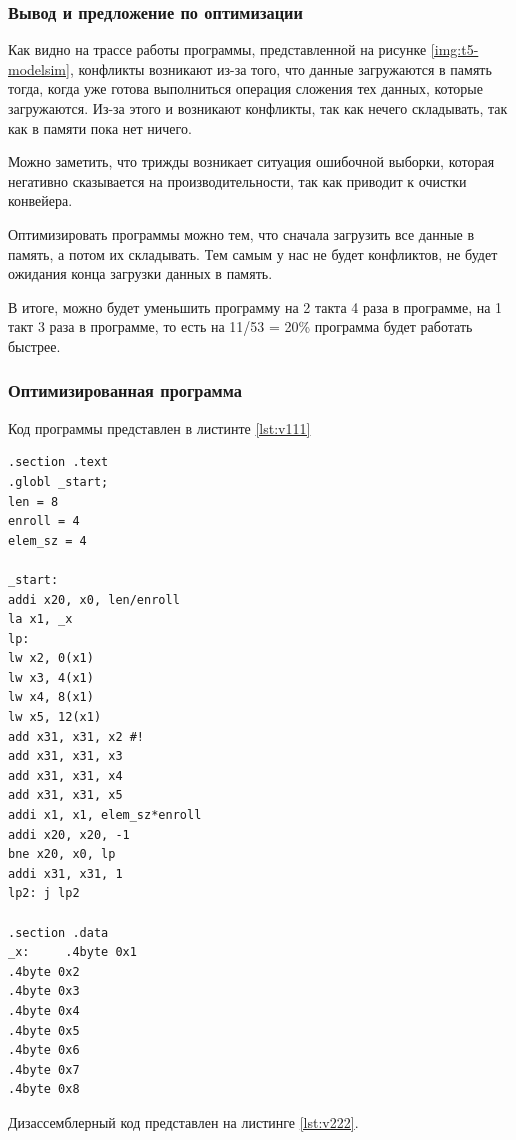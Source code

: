 \clearpage

\subsubsection*{Вывод и предложение по оптимизации}
Как видно на трассе работы программы, представленной на рисунке \ref{img:t5-modelsim}, конфликты возникают из-за того, что данные загружаются в память тогда, когда уже готова выполниться операция сложения тех данных, которые загружаются. Из-за этого и возникают конфликты, так как нечего складывать, так как в памяти пока нет ничего. 

Можно заметить, что трижды возникает ситуация ошибочной выборки, которая негативно сказывается на производительности, так как приводит к очистки конвейера.

Оптимизировать программы можно тем, что сначала загрузить все данные в память, а потом их складывать. Тем самым у нас не будет конфликтов, не будет ожидания конца загрузки данных в память.

В итоге, можно будет уменьшить программу на 2 такта 4 раза в программе, на 1 такт 3 раза в программе, то есть на 11/53 = 20\% программа будет работать быстрее.

\clearpage

\subsubsection*{Оптимизированная программа}

Код программы представлен в листинте \ref{lst:v111}

\begin{lstlisting}[label=lst:v111,caption=Код программы 9 варианта(оптимизированный)]
.section .text
.globl _start;
len = 8
enroll = 4 
elem_sz = 4 

_start:
addi x20, x0, len/enroll
la x1, _x
lp:
lw x2, 0(x1)
lw x3, 4(x1)
lw x4, 8(x1)
lw x5, 12(x1)
add x31, x31, x2 #!
add x31, x31, x3
add x31, x31, x4
add x31, x31, x5
addi x1, x1, elem_sz*enroll
addi x20, x20, -1
bne x20, x0, lp
addi x31, x31, 1
lp2: j lp2

.section .data
_x:     .4byte 0x1
.4byte 0x2
.4byte 0x3
.4byte 0x4
.4byte 0x5
.4byte 0x6
.4byte 0x7
.4byte 0x8
\end{lstlisting}

\clearpage

Дизассемблерный код представлен на листинге \ref{lst:v222}.

